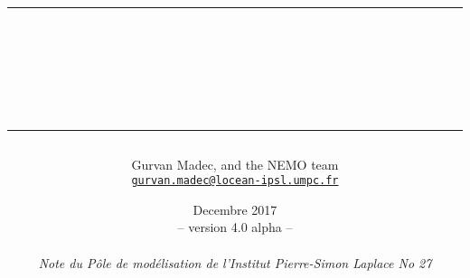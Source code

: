 \documentclass[a4paper, 11pt]{book}
\newcommand{\biblio}{
  
  
}
\begin{document}
\def\biblio{}




\title{
\vspace{ 1.4cm}\rule{345pt}{1.5pt}													\\
\vspace{0.45cm}{\Huge NEMO ocean engine}											\\
\rule{345pt}{1.5pt}
}

\author{
\Large Gurvan Madec, and the NEMO team					                                             \\
\texttt{\small\href{mailto:gurvan.madec@locean-ipsl.umpc.fr}{gurvan.madec@locean-ipsl.umpc.fr}}	\\
}

\date{
Decembre 2017																											\\
{\small  -- version 4.0 alpha --}																				\\
~																															\\
\textit{\small Note du P\^ole de mod\'{e}lisation de l'Institut Pierre-Simon Laplace No 27 }	\\
\vspace{0.45cm}{ ISSN No 1288-1619.}
}

\maketitle
\frontmatter



\dominitoc
\tableofcontents



\mainmatter








\end{document}
